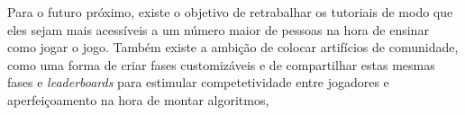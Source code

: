\documentclass[conference]{IEEEtran}
\begin{document}
Para o futuro próximo, existe o objetivo de retrabalhar os tutoriais de modo que eles sejam mais acessíveis a um número maior de pessoas na hora de ensinar como jogar o jogo. Também existe a ambição de colocar artifícios de comunidade, como uma forma de criar fases customizáveis e de compartilhar estas mesmas fases e \textit{leaderboards} para estimular competetividade entre jogadores e aperfeiçoamento na hora de montar algoritmos,


%
\end{document}
